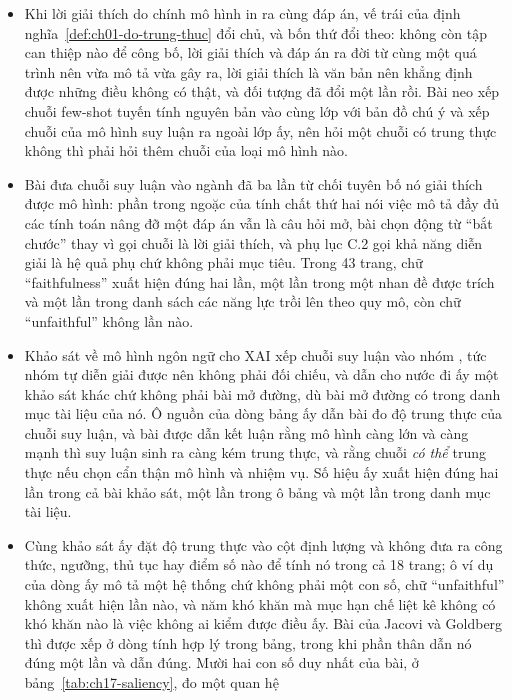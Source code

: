 \begin{tomtat}
\begin{itemize}
  \item Khi lời giải thích do chính mô hình in ra cùng đáp án, vế trái của
định nghĩa~\ref{def:ch01-do-trung-thuc} đổi chủ, và bốn thứ đổi theo: không còn
tập can thiệp nào để công bố, lời giải thích và đáp án ra đời từ cùng một quá
trình nên vừa mô tả vừa gây ra, lời giải thích là văn bản nên khẳng định được
những điều không có thật, và đối tượng đã đổi một lần rồi. Bài neo xếp chuỗi
few-shot tuyến tính nguyên bản vào cùng lớp với bản đồ chú ý và xếp chuỗi của mô
hình suy luận ra ngoài lớp ấy, nên hỏi một chuỗi có trung thực không thì phải hỏi
thêm chuỗi của loại mô hình nào.
  \item Bài đưa chuỗi suy luận vào ngành đã ba lần từ chối tuyên bố nó giải thích
được mô hình: phần trong ngoặc của tính chất thứ hai nói việc mô tả đầy đủ các
tính toán nâng đỡ một đáp án vẫn là câu hỏi mở, bài chọn động từ
\enquote{bắt chước} thay vì gọi chuỗi là lời giải thích, và phụ lục C.2 gọi khả
năng diễn giải là hệ quả phụ chứ không phải mục tiêu. Trong 43 trang, chữ
\enquote{faithfulness} xuất hiện đúng hai lần, một lần trong một nhan đề được
trích và một lần trong danh sách các năng lực trồi lên theo quy mô, còn chữ
\enquote{unfaithful} không lần nào.
  \item Khảo sát về mô hình ngôn ngữ cho XAI xếp chuỗi suy luận vào nhóm
,
tức nhóm tự diễn giải được nên không phải đối chiếu, và dẫn cho
nước đi ấy một khảo sát khác chứ không phải bài mở đường, dù bài mở đường có trong
danh mục tài liệu của nó. Ô nguồn của dòng bảng ấy dẫn bài đo độ trung thực của
chuỗi suy luận, và bài được dẫn kết luận rằng mô hình càng lớn và càng mạnh thì
suy luận sinh ra càng kém trung thực, và rằng chuỗi \emph{có thể} trung thực nếu
chọn cẩn thận mô hình và nhiệm vụ. Số hiệu ấy xuất hiện đúng hai lần trong cả bài
khảo sát, một lần trong ô bảng và một lần trong danh mục tài liệu.
  \item Cùng khảo sát ấy đặt độ trung thực vào cột định lượng và không đưa ra
công thức, ngưỡng, thủ tục hay điểm số nào để tính nó trong cả 18 trang; ô ví dụ
của dòng ấy mô tả một hệ thống chứ không phải một con số, chữ \enquote{unfaithful}
không xuất hiện lần nào, và năm khó khăn mà mục hạn chế liệt kê không có khó khăn
nào là việc không ai kiểm được điều ấy. Bài của Jacovi và Goldberg thì được xếp ở
dòng tính hợp lý trong bảng, trong khi phần thân dẫn nó đúng một lần và dẫn đúng.
Mười hai con số duy nhất của bài, ở bảng~\ref{tab:ch17-saliency}, đo một quan hệ

\end{itemize}
\end{tomtat}
